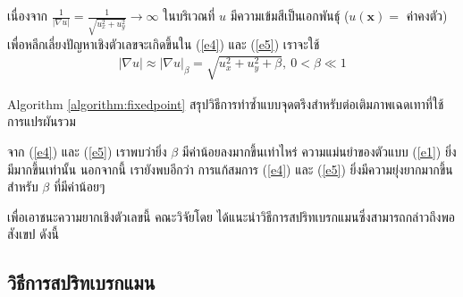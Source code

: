 \hspace{1cm} เนื่องจาก $\tfrac{1}{| \nabla u |}=\tfrac{1}{\sqrt{u_x^2+u_y^2}} \rightarrow \infty$ ในบริเวณที่ $u$ มีความเข้มสีเป็นเอกพันธ์ุ ($u(\mathbf{x})=$ ค่าคงตัว) เพื่อหลีกเลี่ยงปัญหาเชิงตัวเลขจะเกิดขึ้นใน (\ref{e4}) และ (\ref{e5}) เราจะใช้ 
\begin{align*}
|\nabla u| \approx| \nabla u |_\beta=\sqrt{u_x^2+u_y^2+\beta},\ 0< \beta \ll 1
 \end{align*}

\hspace{1cm} Algorithm \ref{algorithm:fixedpoint} สรุปวิธีการทำซ้ำแบบจุดตรึงสำหรับต่อเติมภาพเฉดเทาที่ใช้การแปรผันรวม \\
\vspace{0.5cm} 

\vspace{0.5cm}
\hspace{1cm} จาก (\ref{e4}) และ (\ref{e5}) เราพบว่ายิ่ง $\beta$ มีค่าน้อยลงมากขึ้นเท่าไหร่ ความแม่นยำของตัวแบบ (\ref{e1}) ยิ่งมีมากขึ้นเท่านั้น นอกจากนี้ เรายังพบอีกว่า การแก้สมการ (\ref{e4}) และ (\ref{e5}) ยิ่งมีความยุ่งยากมากขึ้นสำหรับ $\beta$ ที่มีค่าน้อยๆ 

\hspace{1cm} เพื่อเอาชนะความยากเชิงตัวเลขนี้ คณะวิจัยโดย \cite{ref:splitbergman-inpaint} ได้แนะนำวิธีการสปริทเบรกแมนซึ่งสามารถกล่าวถึงพอสังเขป ดังนี้

\subsection{วิธีการสปริทเบรกแมน}

